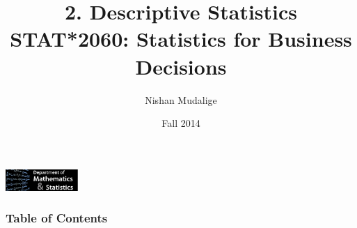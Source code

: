 \documentclass[xcolor=svgnames, compress]{beamer}
\title{2. Descriptive Statistics\\
\vspace*{-0.25cm}
{\normalsize{STAT*2060: Statistics for Business Decisions} } }
\author{Nishan Mudalige}
\institute{Department of Mathematics and Statistics\\
University of Guelph}
\date[STAT*2080F14]{Fall 2014}
\begin{document}
\small


\begin{frame}
\vspace{0.25cm}
\maketitle



\hspace*{-0.25cm}
\includegraphics[width=2.75cm]{logo_UA_tekst_kl.pdf}

\end{frame}


\begin{frame}
\frametitle{Table of Contents}
\tableofcontents
\end{frame}
\end{document}
